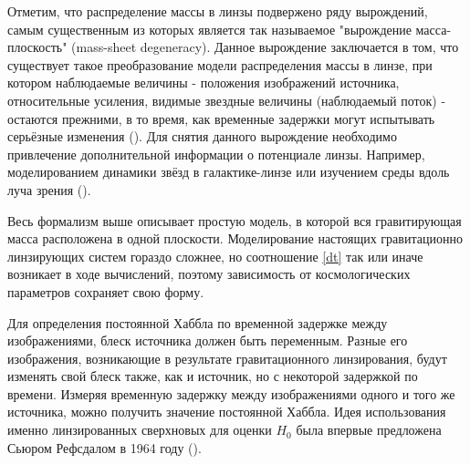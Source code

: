 Отметим, что распределение массы в линзы подвержено ряду вырождений, самым существенным из которых является так называемое "вырождение масса-плоскость" (mass-sheet degeneracy). Данное вырождение заключается в том, что существует такое преобразование модели распределения массы в линзе, при котором наблюдаемые величины - положения изображений источника, относительные усиления, видимые звездные величины (наблюдаемый поток) - остаются прежними, в то время, как временные задержки могут испытывать серьёзные изменения (\cite{falco1985}). Для снятия данного вырождение необходимо привлечение дополнительной информации о потенциале линзы. Например, моделированием динамики звёзд в галактике-линзе или изучением среды вдоль луча зрения
(\cite{suyu2010}).
 
Весь формализм выше описывает простую модель, в которой вся гравитирующая масса расположена в одной плоскости. Моделирование настоящих гравитационно линзирующих систем гораздо сложнее, но соотношение \eqref{dt} так или иначе возникает в ходе вычислений, поэтому зависимость от космологических параметров сохраняет свою форму. 

Для определения постоянной Хаббла по временной задержке между изображениями, блеск источника должен быть переменным. Разные его изображения, возникающие в результате гравитационного линзирования, будут изменять свой блеск также, как и источник, но с некоторой задержкой по времени. Измеряя временную задержку между изображениями одного и того же источника, можно получить значение постоянной Хаббла. Идея использования именно линзированных сверхновых для оценки $H_0$ была впервые предложена Сьюром Рефсдалом в 1964 году (\cite{refsdal1964}). 